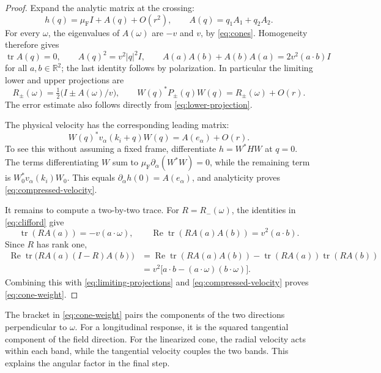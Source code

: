 \documentclass[11pt,a4paper]{article}
\newcommand{\R}{\mathbb R}
\DeclareMathOperator{\tr}{tr}
\DeclareMathOperator{\Rea}{Re}
\theoremstyle{remark}
\numberwithin{equation}{section}
\begin{document}
\begin{proof}
Expand the analytic matrix at the crossing:
\begin{equation}\label{eq:linear-cone}
 h(q)=\mu_{\mathrm F}I+A(q)+O(r^2),\qquad
 A(q)=q_1A_1+q_2A_2.
\end{equation}
For every $\omega$, the eigenvalues of $A(\omega)$ are $-v$ and $v$,
by \eqref{eq:cones}. Homogeneity therefore gives
\begin{equation}\label{eq:clifford}
 \tr A(q)=0,\qquad A(q)^2=v^2|q|^2I,
 \qquad
 A(a)A(b)+A(b)A(a)=2v^2(a\cdot b)I
\end{equation}
for all $a,b\in\R^2$; the last identity follows by polarization.
In particular the limiting lower and upper projections are
\begin{equation}\label{eq:limiting-projections}
 R_\pm(\omega)=\tfrac12\bigl(I\pm A(\omega)/v\bigr),
 \qquad
 W(q)^*P_\pm(q)W(q)=R_\pm(\omega)+O(r).
\end{equation}
The error estimate also follows directly from
\eqref{eq:lower-projection}.

The physical velocity has the corresponding leading matrix:
\begin{equation}\label{eq:compressed-velocity}
 W(q)^*v_\alpha(k_i+q)W(q)=A(e_\alpha)+O(r).
\end{equation}
To see this without assuming a fixed frame, differentiate
$h=W^*HW$ at $q=0$. The terms differentiating $W$ sum to
$\mu_{\mathrm F}\partial_\alpha(W^*W)=0$, while the remaining
term is $W_0^*v_\alpha(k_i)W_0$. This equals
$\partial_\alpha h(0)=A(e_\alpha)$, and analyticity proves
\eqref{eq:compressed-velocity}.

It remains to compute a two-by-two trace. For $R=R_-(\omega)$,
the identities in \eqref{eq:clifford} give
\[
 \tr(RA(a))=-v(a\cdot\omega),\qquad
 \Rea\tr(RA(a)A(b))=v^2(a\cdot b).
\]
Since $R$ has rank one,
\begin{align*}
 \Rea\tr\bigl(RA(a)(I-R)A(b)\bigr)
 &=\Rea\tr(RA(a)A(b))
       -\tr(RA(a))\tr(RA(b))\\
 &=v^2\bigl[a\cdot b-(a\cdot\omega)(b\cdot\omega)\bigr].
\end{align*}
Combining this with \eqref{eq:limiting-projections} and
\eqref{eq:compressed-velocity} proves \eqref{eq:cone-weight}.
\end{proof}

The bracket in \eqref{eq:cone-weight} pairs the components of the
two directions perpendicular to $\omega$. For a longitudinal response,
it is the squared tangential component of the field direction.
For the linearized cone, the radial velocity acts within each band,
while the tangential velocity couples the two bands. This explains
the angular factor in the final step.
\end{document}

